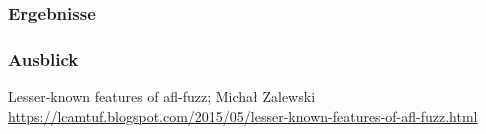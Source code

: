 \documentclass[handout]{beamer}
\begin{document}
\begin{frame}
    \frametitle{Ergebnisse}
\end{frame}

\begin{frame}
    \frametitle{Ausblick}
\end{frame}

\begin{frame}

\end{frame}

\begin{thebibliography}{}
    Lesser-known features of afl-fuzz; Michał Zalewski \url{https://lcamtuf.blogspot.com/2015/05/lesser-known-features-of-afl-fuzz.html}
\end{thebibliography}
\end{document}
